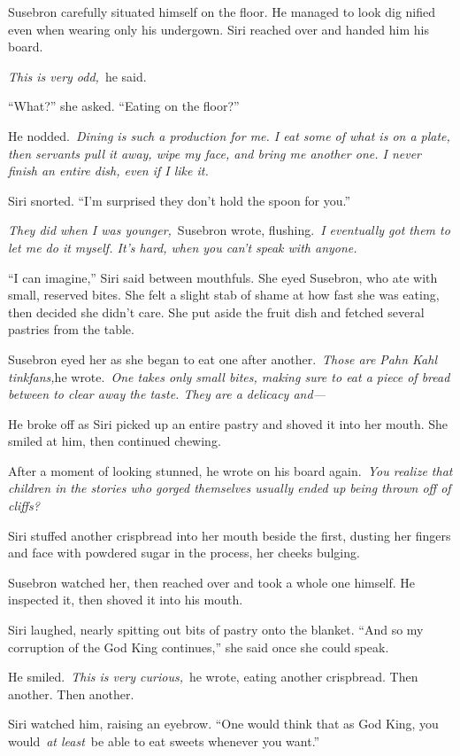 Susebron carefully situated himself on the floor. He managed to look dig nified even when wearing only his undergown. Siri reached over and handed him his board.

\textit{This is very odd,}~he said.

“What?” she asked. “Eating on the floor?”

He nodded.~\textit{Dining is such a production for me. I eat some of what is on a plate, then servants pull it away, wipe my face, and bring me another one. I never finish an entire dish, even if I like it.}

Siri snorted. “I’m surprised they don’t hold the spoon for you.”

\textit{They did when I was younger,}~Susebron wrote, flushing.~\textit{I eventually got them to let me do it myself. It’s hard, when you can’t speak with anyone.}

“I can imagine,” Siri said between mouthfuls. She eyed Susebron, who ate with small, reserved bites. She felt a slight stab of shame at how fast she was eating, then decided she didn’t care. She put aside the fruit dish and fetched several pastries from the table.

Susebron eyed her as she began to eat one after another.~\textit{Those are Pahn Kahl tinkfans,}he wrote.~\textit{One takes only small bites, making sure to eat a piece of bread between to clear away the taste. They are a delicacy and—}

He broke off as Siri picked up an entire pastry and shoved it into her mouth. She smiled at him, then continued chewing.

After a moment of looking stunned, he wrote on his board again.~\textit{You realize that children in the stories who gorged themselves usually ended up being thrown off of cliffs?}

Siri stuffed another crispbread into her mouth beside the first, dusting her fingers and face with powdered sugar in the process, her cheeks bulging.

Susebron watched her, then reached over and took a whole one himself. He inspected it, then shoved it into his mouth.

Siri laughed, nearly spitting out bits of pastry onto the blanket. “And so my corruption of the God King continues,” she said once she could speak.

He smiled.~\textit{This is very curious,}~he wrote, eating another crispbread. Then another. Then another.

Siri watched him, raising an eyebrow. “One would think that as God King, you would~\textit{at least}~be able to eat sweets whenever you want.”

